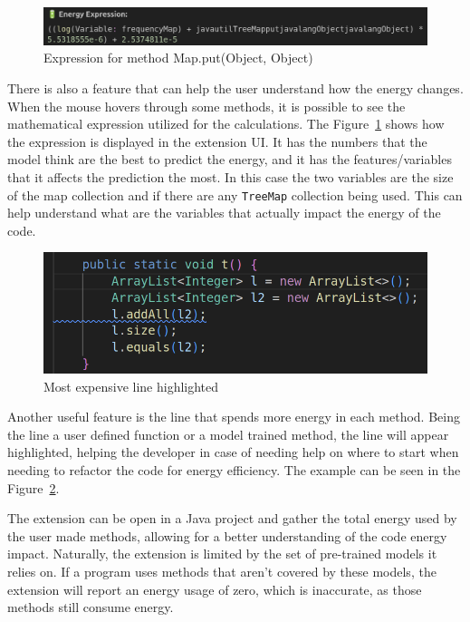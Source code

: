 \begin{figure}[htbp]
  \centering
  \includegraphics[width = .8 \textwidth]{figures/extension_expression_example.png}
  \caption{Expression for method Map.put(Object, Object)}
  \label{fig:extension_expression_example}
\end{figure}

There is also a feature that can help the user understand how the energy changes. When the mouse hovers through some methods, it is possible to see the mathematical expression utilized for the calculations. The Figure~\ref{fig:extension_expression_example} shows how the expression is displayed in the extension UI. It has the numbers that the model think are the best to predict the energy, and it has the features/variables that it affects the prediction the most. In this case the two variables are the size of the map collection and if there are any \texttt{TreeMap} collection being used. This can help understand what are the variables that actually impact the energy of the code. 

\begin{figure}[htbp]
  \centering
  \includegraphics[width = .8 \textwidth]{figures/most_expensive_line.png}
  \caption{Most expensive line highlighted}
  \label{fig:most_expensive_line}
\end{figure}

{\color{blue}
Another useful feature is the line that spends more energy in each method. Being the line a user defined function or a model trained method, the line will appear highlighted, helping the developer in case of needing help on where to start when needing to refactor the code for energy efficiency. The example can be seen in the Figure~\ref{fig:most_expensive_line}.}

The extension can be open in a Java project and gather the total energy used by the user made methods, allowing for a better understanding of the code energy impact. Naturally, the extension is limited by the set of pre-trained models it relies on. If a program uses methods that aren't covered by these models, the extension will report an energy usage of zero, which is inaccurate, as those methods still consume energy.